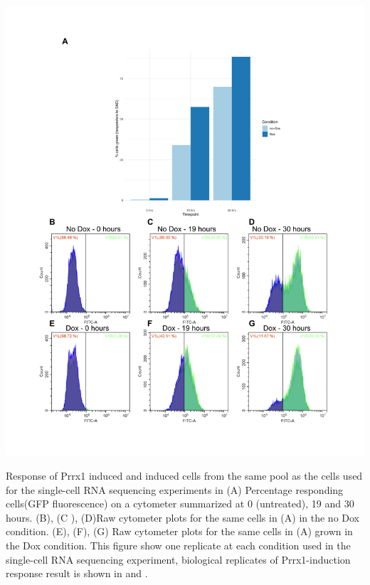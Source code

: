 \begin{suppfigure}[p]  
    \centering
    \includegraphics[width=\linewidth]{figures/hedgehog/SuppFigure20.png}
    \caption[Flow Cytometry results for cells used in Prrx1 induction single-cell RNA sequencing experiment]{
        Response of Prrx1 induced and induced cells from the same pool as the cells used for the single-cell RNA sequencing experiments in  (A) Percentage responding cells(GFP fluorescence) on a cytometer summarized  at 0 (untreated), 19 and 30 hours. (B), (C ), (D)Raw cytometer plots for the same cells in (A) in the no Dox condition. (E), (F), (G) Raw cytometer plots for the same cells in (A) grown in the Dox condition. This figure show one replicate at each condition used in the single-cell RNA sequencing experiment, biological replicates of Prrx1-induction response result is shown in  and . 
    }
    \label{fig:hh_figureS20}
\end{suppfigure}


